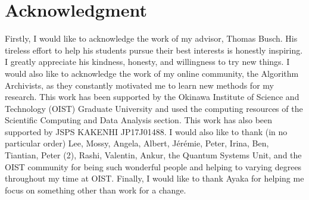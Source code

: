 \chapter*{Acknowledgment}

Firstly, I would like to acknowledge the work of my advisor, Thomas Busch.
His tireless effort to help his students pursue their best interests is honestly inspiring.
I greatly appreciate his kindness, honesty, and willingness to try new things.
I would also like to acknowledge the work of my online community, the Algorithm Archivists, as they constantly motivated me to learn new methods for my research.
This work has been supported by the Okinawa Institute of Science and Technology (OIST) Graduate University and used the computing resources of the Scientific Computing and Data Analysis section.
This work has also been supported by JSPS KAKENHI JP17J01488.
I would also like to thank (in no particular order) Lee, Mossy, Angela, Albert, J\'er\'emie, Peter, Irina, Ben, Tiantian, Peter (2), Rashi, Valentin, Ankur, the Quantum Systems Unit, and the OIST community for being such wonderful people and helping to varying degrees throughout my time at OIST.
Finally, I would like to thank Ayaka for helping me focus on something other than work for a change.
